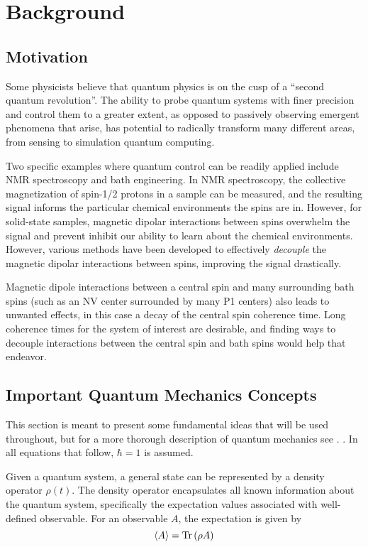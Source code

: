 \chapter{Background}

\section{Motivation}

Some physicists believe that quantum physics is on the cusp of a ``second quantum revolution''.\cite{quantum-rev} The ability to probe quantum systems with finer precision and control them to a greater extent, as opposed to passively observing emergent phenomena that arise, has potential to radically transform many different areas, from sensing to simulation quantum computing.

Two specific examples where quantum control can be readily applied include NMR spectroscopy and bath engineering. In NMR spectroscopy, the collective magnetization of spin-1/2 protons in a sample can be measured, and the resulting signal informs the particular chemical environments the spins are in. However, for solid-state samples, magnetic dipolar interactions between spins overwhelm the signal and prevent inhibit our ability to learn about the chemical environments. However, various methods have been developed to effectively \emph{decouple} the magnetic dipolar interactions between spins, improving the signal drastically.

Magnetic dipole interactions between a central spin and many surrounding bath spins (such as an NV center surrounded by many P1 centers) also leads to unwanted effects, in this case a decay of the central spin coherence time. Long coherence times for the system of interest are desirable, and finding ways to decouple interactions between the central spin and bath spins would help that endeavor.

\section{Important Quantum Mechanics Concepts}

This section is meant to present some fundamental ideas that will be used throughout, but for a more thorough description of quantum mechanics see
\cite{mcintyre2012quantum, sakurai2017modern}.
.
In all equations that follow, $\hbar = 1$ is assumed.

Given a quantum system, a general state can be represented by a density operator $\rho(t)$. The density operator encapsulates all known information about the quantum system, specifically the expectation values associated with well-defined observable. For an observable $A$, the expectation is given by
\begin{equation}\label{eq:measure}
    \langle A \rangle = \text{Tr}\left( \rho A \right)
\end{equation}

